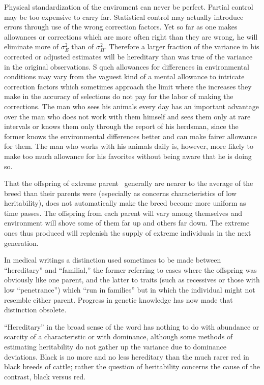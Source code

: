 Physical standardization of the enviroment can never be perfect.
Partial control may be too expensive to carry far. Statistical control
may actually introduce errors through use of the wrong correction factors.
Yet so far as one makes allowances or corrections which are more
often right than they are wrong, he will eliminate more of $\sigma_E^2$ than of
$\sigma_H^2$. Therefore a larger fraction of the variance in his corrected or
adjusted estimates will be hereditary than was true of the variance in
the original observations. S quch allowances for differences in environmental
conditions may vary from the vaguest kind of a mental allowance
to intricate correction factors which sometimes approach the limit
where the increases they make in the accuracy of selections do not pay
for the labor of making the corrections. The man who sees his animals
every day has an important advantage over the man who does not work
with them himself and sees them only at rare intervals or knows them
only through the report of his herdsman, since the former knows the
environmental differences better and can make fairer allowance for
them. The man who works with his animals daily is, however, more
likely to make too much allowance for his favorites without being aware
that he is doing so.

That the offspring of extreme parent~ generally are nearer to the
average of the breed than their parents were (especially as concerns
characteristics of low heritability), does not automatically make the
breed become more uniform as time passes. The offspring from each
parent will vary among themselves and environment will shove some of
them far up and others far down. The extreme ones thus produced will
replenish the supply of extreme individuals in the next generation.

In medical writings a distinction used sometimes to be made
between ``hereditary'' and ``familial,'' the former referring to cases
where the offspring was obviously like one parent, and the latter to
traits (such as recessives or those with low ``penetrance'') which ``run in
families'' but in which the individual might not resemble either parent.
Progress in genetic knowledge has now made that distinction obsolete.

``Hereditary'' in the broad sense of the word has nothing to do with
abundance or scarcity of a characteristic or with dominance, although
some methods of estimating heritability do not gather up the variance
due to dominance deviations. Black is no more and no less hereditary
than the much rarer red in black breeds of cattle; rather the question of
heritability concerns the cause of the contrast, black versus red.

